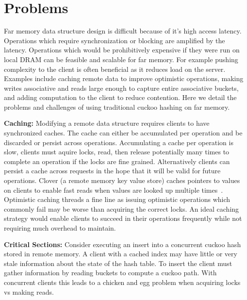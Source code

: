 \section{Problems}
\label{sec:problems}

Far memory data structure design is difficult because of
it's high access latency. Operations which require
synchronization or blocking are amplified by the latency.
Operations which would be prohibitively expensive if they
were run on local DRAM can be feasible and scalable for far
memory. For example pushing complexity to the client is
often beneficial as it reduces load on the server. Examples
include caching remote data to improve optimistic
operations, making writes associative and reads large enough
to capture entire associative buckets, and adding
computation to the client to reduce contention. Here we
detail the problems and challenges of using traditional
cuckoo hashing on far memory.


\textbf{Caching:} Modifying a remote data structure requires
clients to have synchronized caches. The cache can either be
accumulated per operation and be discarded or persist across
operations.  Accumulating a cache per operation is slow,
clients must aquire locks, read, then release potentially
many times to complete an operation if the locks are fine
grained. Alternatively clients can persist a cache across
requests in the hope that it will be valid for future
operations.  Clover (a remote memory key value store) caches
pointers to values on clients to enable fast reads when
values are looked up multiple times~\cite{clover}.
Optimistic caching threads a fine line as issuing optimistic
operations which commonly fail may be worse than acquiring
the correct locks.  An ideal caching strategy would enable
clients to succeed in their operations frequently while not
requiring much overhead to maintain. 


\textbf{Critical Sections:} Consider executing an insert
into a concurrent cuckoo hash stored in remote memory. A
client with a cached index may have little or very stale
information about the state of the hash table. To insert the
client must gather information by reading buckets to compute
a cuckoo path. With concurrent clients this leads to a
chicken and egg problem when acquiring locks vs making
reads.

